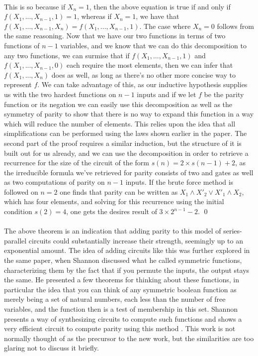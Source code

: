 \documentclass{article}
\begin{document}
\paragraph*{}
  This is so because if $X_n = 1$, then the above equation is true if and only if 
$f(X_1, ..., X_{n-1}, 1) = 1$, whereas if $X_n = 1$, we have that $f(X_1, ..., X_{n-1}, X_n) =
f(X_1, ..., X_{n-1}, 1)$. The case where $X_n = 0$ follows from the same reasoning. Now
that we have our two functions in terms of two functions of $n - 1$ variables, and we know
that we can do this decomposition to any two functions, we can surmise that if
$f(X_1, ..., X_{n-1}, 1)$ and $f(X_1, ..., X_{n-1}, 0)$ each require the most elements, then
we can infer that $f(X_1, ..., X_n)$ does as well, as long as there's no other more concise
way to represent $f$. We can take advantage of this, as our inductive hypothesis supplies us
with the two hardest functions on $n - 1$ inputs and if we let $f$ be the parity function
or its negation we can easily use this decomposition as well as the symmetry of parity to
show that there is no way to expand this function in a way which will reduce the number of
elements. This relies upon the idea that all simplifications can be performed using the laws
shown earlier in the paper. The second part of the proof requires a similar induction, but
the structure of it is built out for us already, and we can use the decomposition in order
to retrieve a recurrence for the size of the circuit of the form $s(n) = 2 \times s(n - 1) + 2$,
as the irreducible formula we've retrieved for parity consists of two and gates as well as
two computations of parity on $n - 1$ inputs. If the brute force method is followed on $n = 2$
one finds that parity can be written as $X_1 \wedge X'_2 \vee X'_1 \wedge X_2$, which has
four elements, and solving for this recurrence using the initial condition $s(2) = 4$, 
one gets the desires result of $3 \times 2^{n-1} - 2$. \qed

\paragraph*{}
  The above theorem is an indication that adding parity to this model of series-parallel circuits
could substantially increase their strength, seemingly up to an exponential amount. The idea of
adding circuits like this was further explored in the same paper, when Shannon discussed what he
called symmetric functions, characterizing them by the fact that if you permute the inputs, the
output stays the same. He presented a few theorems for thinking about these functions, in particular
the idea that you can think of any symmetric boolean function as merely being a set of natural
numbers, each less than the number of free variables, and the function then is a test of membership
in this set. Shannon presents a way of synthesizing circuits to compute such functions and shows
a very efficient circuit to compute parity using this method \cite{Shannon1938}. This work is
not normally thought of as the precursor to the new work, but the similarities are too glaring
not to discuss it briefly.
\end{document}
